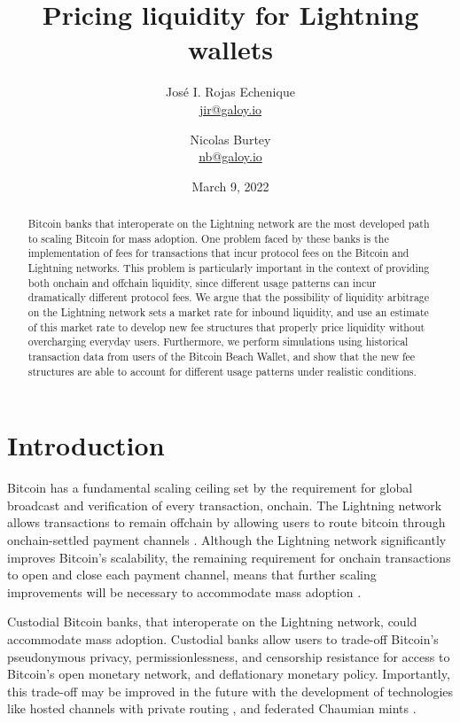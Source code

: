 \documentclass[10pt,twocolumn]{article}
\title{Pricing liquidity for Lightning wallets}
\author{
	José I. Rojas Echenique\\ \url{jir@galoy.io}
	\and
	Nicolas Burtey\\ \url{nb@galoy.io}
}
\date{March 9, 2022}
\begin{document}
\maketitle

\begin{abstract}

Bitcoin banks that interoperate on the Lightning network
are the most developed path to scaling Bitcoin for mass adoption.
One problem faced by these banks is the implementation
of fees for transactions that incur protocol fees on
the Bitcoin and Lightning networks.
This problem is particularly important in the context of
providing both onchain and offchain liquidity,
since different usage patterns can incur dramatically different protocol fees.
We argue that the possibility of liquidity arbitrage on the Lightning network
sets a market rate for inbound liquidity,
and use an estimate of this market rate to develop new
fee structures that properly price liquidity without overcharging
everyday users.
Furthermore, we perform simulations using
historical transaction data from users of the Bitcoin Beach Wallet,
and show that the new fee structures are able to
account for different usage patterns under realistic conditions.

\end{abstract}

\section{Introduction}

Bitcoin has a fundamental scaling ceiling set by the requirement
for global broadcast and verification of every transaction, onchain.
The Lightning network allows transactions to remain offchain
by allowing users to route bitcoin through onchain-settled payment channels \citep{poon2015}.
Although the Lightning network significantly improves Bitcoin's scalability,
the remaining requirement for onchain transactions to open and close each payment channel,
means that further scaling improvements will be necessary
to accommodate mass adoption \citep{burchert2018}.

Custodial Bitcoin banks, that interoperate on the Lightning network,
could accommodate mass adoption.
Custodial banks allow users to trade-off Bitcoin's
pseudonymous privacy,
permissionlessness, and
censorship resistance
for access to
Bitcoin's open monetary network,
and deflationary monetary policy.
Importantly, this trade-off may be improved in the future
with the development of technologies like
hosted channels with private routing \citep{kumaigorodski2021},
and federated Chaumian mints \citep{sirion2021}.
\end{document}
